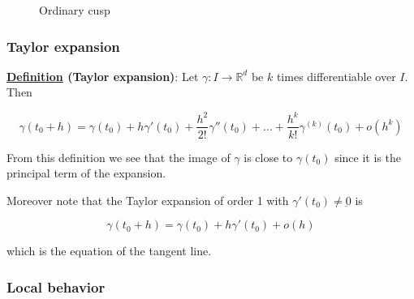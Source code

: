 \documentclass[10pt]{extarticle}
\newcommand{\R}{\mathbb{R}}
\begin{document}
\begin{figure}
    \centering
    \caption{Ordinary cusp}
    \label{fig:ordinary_cusp}
\end{figure}

\subsubsection{Taylor expansion}

\textbf{\underline{Definition} (Taylor expansion)}:
Let $\gamma: I \to \R^d$ be $k$ times differentiable over $I$.
Then

$$
    \gamma(t_0 + h) =
    \gamma(t_0) +
    h \gamma'(t_0) +
    \frac{h^2}{2!} \gamma''(t_0) +
    \ldots +
    \frac{h^k}{k!} \gamma^{(k)}(t_0) +
    o(h^k)
$$

From this definition we see that the image of $\gamma$ is close to $\gamma (t_0)$ since it is the principal term of the expansion.

Moreover note that the Taylor expansion of order 1 with $\gamma'(t_0) \ne \underbar{0}$ is

$$
    \gamma(t_0 + h) = \gamma(t_0) + h \gamma'(t_0) + o(h)
$$

which is the equation of the tangent line.

\subsubsection{Local behavior}
\end{document}
